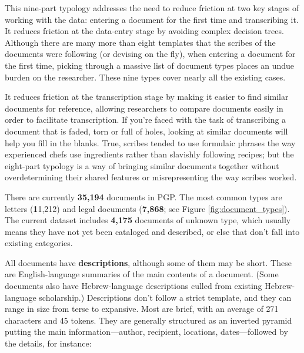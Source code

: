 \documentclass{article}
\def\totalDocuments{35,194}
\def\totalLetter{11,212}
\def\totalLegalDocument{7,868}
\def\totalUnknown{4,175}
\begin{document}
This nine-part typology addresses the need to reduce friction at two key stages of working with the data: entering a document for the first time and transcribing it. It reduces friction at the data-entry stage by avoiding complex decision trees. Although there are many more than eight templates that the scribes of the documents were following (or devising on the fly), when entering a document for the first time, picking through a massive list of document types places an undue burden on the researcher. These nine types cover nearly all the existing cases. 

It reduces friction at the transcription stage by making it easier to find similar documents for reference, allowing researchers to compare documents easily in order to facilitate transcription. If you’re faced with the task of transcribing a document that is faded, torn or full of holes, looking at similar documents will help you fill in the blanks. True, scribes tended to use formulaic phrases the way experienced chefs use ingredients rather than slavishly following recipes; but the eight-part typology is a way of bringing similar documents together without overdetermining their shared features or misrepresenting the way scribes worked.

There are currently \textbf{\totalDocuments} documents in PGP. The most common types are letters (\textbf\totalLetter) and legal documents (\textbf{\totalLegalDocument}; see Figure \ref{fig:document_types}). The current dataset includes \textbf{\totalUnknown} documents of unknown type, which usually means they have not yet been cataloged and described, or else that don’t fall into existing categories. 

All documents have \textbf{descriptions}, although some of them may be short. These are English-language summaries of the main contents of a document. (Some documents also have Hebrew-language descriptions culled from existing Hebrew-language scholarship.) Descriptions don’t follow a strict template, and they can range in size from terse to expansive. Most are brief, with an average of 271 characters and 45 tokens. They are generally structured as an inverted pyramid putting the main information—author, recipient, locations, dates—followed by the details, for instance: 
\end{document}
